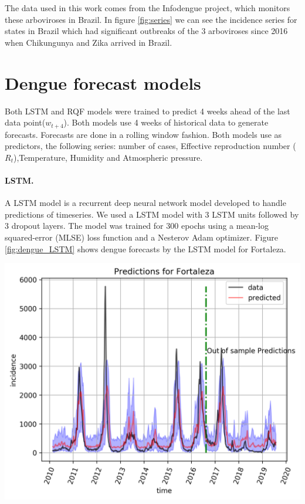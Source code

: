 \documentclass[a0,portrait]{a0poster}
\begin{document}
\begin{multicols}{3}
The data used in this work comes from the Infodengue project, which monitors 
these arboviroses in Brazil. In figure \ref{fig:series} we can see the 
incidence series for states in Brazil which had significant outbreaks of the 3 
arboviroses since 2016 when Chikungunya and Zika arrived in Brazil.


\section*{Dengue forecast models}
Both LSTM and RQF models were trained to predict 4 weeks ahead of the last data 
point($w_{t+4}$). Both models use 4 weeks of historical data to generate 
forecasts. Forecasts are done in a rolling window fashion. Both models use as 
predictors, the following series: number of cases, Effective reproduction 
number ($R_t$),Temperature, Humidity and Atmospheric pressure.
\paragraph*{LSTM.}
A LSTM model is a recurrent deep neural network model developed to handle 
predictions of timeseries. We used a LSTM model with 3 LSTM units followed by 
3 dropout layers. The model was trained for 300 epochs using a mean-log 
squared-error (MLSE) loss function  and a Nesterov Adam 
optimizer\cite{sutskever2013importance}. Figure \ref{fig:dengue_LSTM} shows 
dengue forecasts by the LSTM model for Fortaleza.

\begin{center}
    \includegraphics[width=0.8\linewidth]{figures/lstm_Fortaleza_unc.png}
    \label{fig:dengue_LSTM}
\end{center}%


\end{multicols}
\end{document}

